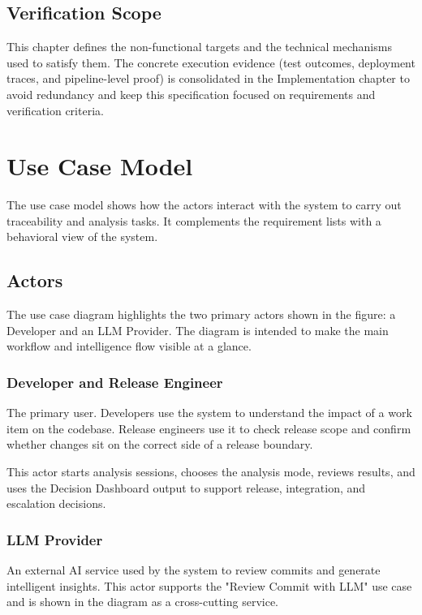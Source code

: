 \subsection{Verification Scope}

This chapter defines the non-functional targets and the technical mechanisms
used to satisfy them. The concrete execution evidence (test outcomes,
deployment traces, and pipeline-level proof) is consolidated in the
Implementation chapter to avoid redundancy and keep this specification focused
on requirements and verification criteria.

\section{Use Case Model}
\label{sec:use-case-model}

The use case model shows how the actors interact with the system to carry out
traceability and analysis tasks. It complements the requirement lists with a
behavioral view of the system.

\subsection{Actors}
\label{subsec:actors}

The use case diagram highlights the two primary actors shown in the figure:
a Developer and an LLM Provider. The diagram is intended to make the main
workflow and intelligence flow visible at a glance.

\subsubsection{Developer and Release Engineer}

The primary user. Developers use the system to understand the impact of a work
item on the codebase. Release engineers use it to check release scope and
confirm whether changes sit on the correct side of a release boundary.

This actor starts analysis sessions, chooses the analysis mode, reviews
results, and uses the Decision Dashboard output to support release,
integration, and escalation decisions.

\subsubsection{LLM Provider}

An external AI service used by the system to review commits and generate
intelligent insights. This actor supports the "Review Commit with LLM" use
case and is shown in the diagram as a cross-cutting service.

